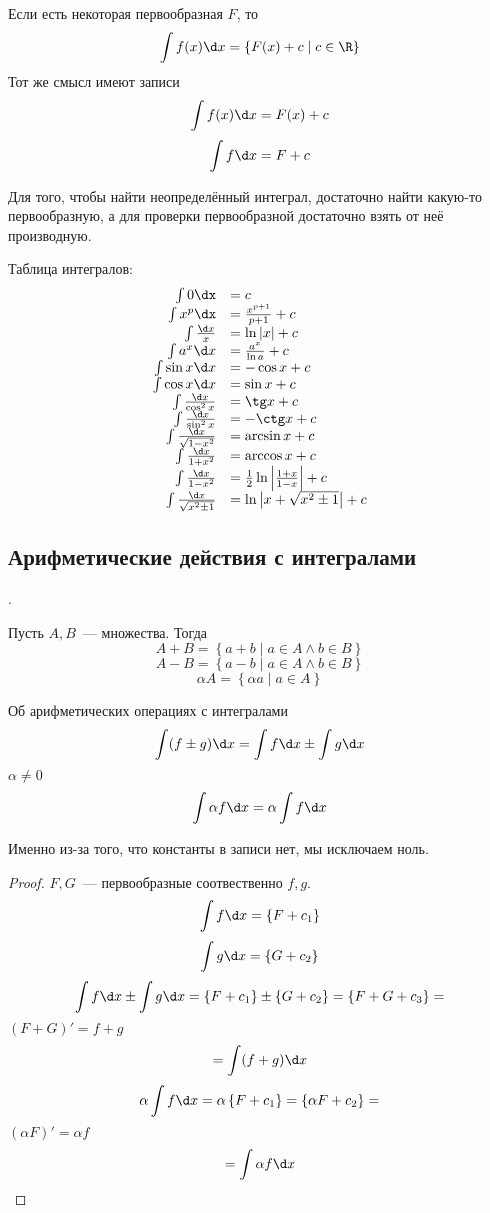 Если есть некоторая первообразная $F$, то
$$\int f(x)\d x = \left\{F(x) + c \mid c \in \R\right\}$$
Тот же смысл имеют записи
$$\int f(x)\d x = F(x) + c$$
$$\int f\d x = F + c$$

Для того, чтобы найти неопределённый интеграл, достаточно найти какую-то первообразную, а для проверки первообразной достаточно взять от неё производную.

Таблица интегралов:
$$
\begin{array}{rl}
\int 0\dx &= c \\
\int x^p\dx &= \frac{x^{p+1}}{p + 1} + c \\
\int \frac{\d x}{x} &= \ln |x| + c \\
\int a^x \d x &= \frac{a^x}{\ln a} + c \\
\int \sin x \d x &= -\cos x + c \\
\int \cos x \d x &= \sin x + c \\
\int \frac{\d x}{\cos^2 x} &= \tg x + c \\
\int \frac{\d x}{\sin^2 x} &= -\ctg x + c \\
\int \frac{\d x}{\sqrt{1 - x^2}} &= \arcsin x + c \\
\int \frac{\d x}{1 + x^2} &= \arccos x + c \\
\int \frac{\d x}{1 - x^2} &= \frac12 \ln \left|\frac{1+x}{1-x}\right| + c\\
\int \frac{\d x}{\sqrt{x^2 \pm 1}} &= \ln \left|x + \sqrt{x^2 \pm 1}\right| + c \\
\end{array}
$$

\subsection{Арифметические действия с интегралами}.

\begin{Def}
Пусть $A, B$~--- множества. Тогда
$$A + B = \left\{a + b \mid a \in A \land b \in B\right\}$$
$$A - B = \left\{a - b \mid a \in A \land b \in B\right\}$$
$$\alpha A = \left\{\alpha a \mid a \in A\right\}$$
\end{Def}

\begin{theorem}{Об арифметических операциях с интегралами}
$$\int (f \pm g) \d x = \int f \d x \pm \int g \d x$$
$\alpha \ne 0$
$$\int \alpha f \d x = \alpha \int f \d x$$
\end{theorem}
\begin{Rem}
Именно из-за того, что константы в записи нет, мы исключаем ноль.
\end{Rem}
\begin{proof}
$F, G$~--- первообразные соотвественно $f, g$.
$$\int f \d x = \left\{F + c_1\right\}$$
$$\int g \d x = \left\{G + c_2\right\}$$
$$\int f \d x \pm \int g \d x = \left\{F + c_1\right\} \pm \left\{G + c_2\right\} = \left\{F+G+c_3\right\} = $$
$(F+G)' = f + g$
$$ = \int (f+g)\d x$$
$$\alpha \int f \d x = \alpha \left\{F + c_1\right\} = \left\{\alpha F + c_2\right\} = $$
$(\alpha F)' = \alpha f$
$$ = \int \alpha f\d x$$
\end{proof}

